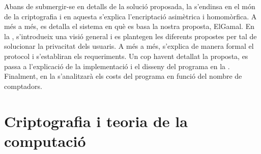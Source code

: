 \documentclass{article}
\begin{document}
Abans de submergir-se en detalls de la solució proposada, la  s'endinsa en el món de la criptografia i en aquesta s'explica l'encriptació asimètrica i homomòrfica. A més a més, es detalla el sistema en què es basa la nostra proposta, ElGamal. En la ,  s'introdueix una visió general i es plantegen les diferents propostes per tal de solucionar la privacitat dels usuaris. A més a més, s'explica de manera formal el protocol i s'establiran els requeriments. Un cop havent detallat la proposta, es passa a l'explicació de la implementació i el disseny del programa en la . Finalment, en la   s'analitzarà els costs del programa en funció del nombre de comptadors.
\newpage\part{Criptografia i teoria de la computació}\label{part:criptografia}
\end{document}
